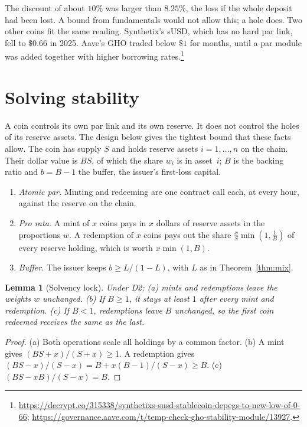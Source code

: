 \documentclass[11pt]{article}
\newtheorem{lemma}[theorem]{Lemma}
\theoremstyle{definition}
\theoremstyle{remark}
\begin{document}
The discount of about $10\%$ was larger than $8.25\%$, the loss if the whole deposit had been lost. A bound from fundamentals would not allow this; a hole does. Two other coins fit the same reading. Synthetix's sUSD, which has no hard par link, fell to $\$0.66$ in 2025. Aave's GHO traded below $\$1$ for months, until a par module was added together with higher borrowing rates.\footnote{\url{https://decrypt.co/315338/synthetixs-susd-stablecoin-depegs-to-new-low-of-0-66}; \url{https://governance.aave.com/t/temp-check-gho-stability-module/13927}.}

\section{Solving stability}

A coin controls its own par link and its own reserve. It does not control the holes of its reserve assets. The design below gives the tightest bound that these facts allow. The coin has supply $S$ and holds reserve assets $i=1,\dots,n$ on the chain. Their dollar value is $BS$, of which the share $w_i$ is in asset~$i$; $B$ is the backing ratio and $b=B-1$ the buffer, the issuer's first-loss capital.

\begin{enumerate}[label=\textup{D\arabic*.},leftmargin=3em]
\item \emph{Atomic par.} Minting and redeeming are one contract call each, at every hour, against the reserve on the chain.
\item \emph{Pro rata.} A mint of $x$ coins pays in $x$ dollars of reserve assets in the proportions $w$. A redemption of $x$ coins pays out the share $\frac{x}{S}\min(1,\frac1B)$ of every reserve holding, which is worth $x\min(1,B)$.
\item \emph{Buffer.} The issuer keeps $b\ge L/(1-L)$, with $L$ as in Theorem~\ref{thm:mix}.
\end{enumerate}

\begin{lemma}[Solvency lock]\label{lem:lock}
Under \textup{D2}: \textup{(a)} mints and redemptions leave the weights $w$ unchanged. \textup{(b)} If $B\ge1$, it stays at least $1$ after every mint and redemption. \textup{(c)} If $B<1$, redemptions leave $B$ unchanged, so the first coin redeemed receives the same as the last.
\end{lemma}

\begin{proof}
(a) Both operations scale all holdings by a common factor. (b) A mint gives $(BS+x)/(S+x)\ge1$. A redemption gives $(BS-x)/(S-x)=B+x(B-1)/(S-x)\ge B$. (c) $(BS-xB)/(S-x)=B$.
\end{proof}
\end{document}
